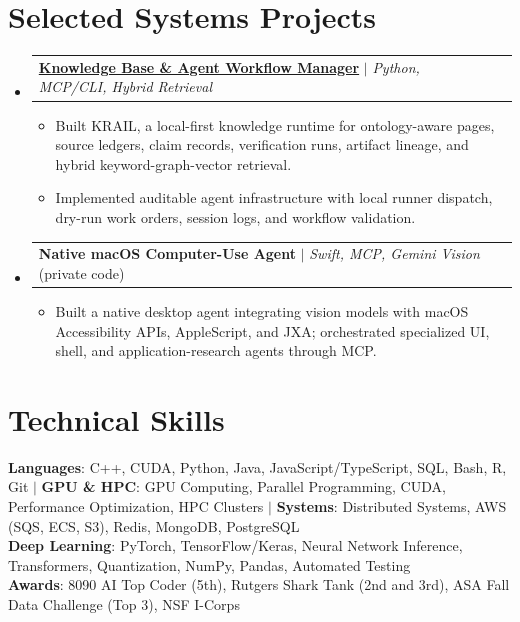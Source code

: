 \documentclass[letterpaper,11pt]{article}
\makeatletter
\newcommand{\resumeItem}[1]{
  \item\small{
    {#1 \vspace{-2pt}}
  }
}
\newcommand{\resumeProjectHeading}[2]{
    \item
    \begin{tabular*}{0.97\textwidth}{l@{\extracolsep{\fill}}r}
      \small#1 & #2 \\
    \end{tabular*}\vspace{-7pt}
}
\newcommand{\resumeSubHeadingListStart}{\begin{itemize}[leftmargin=0.15in, label={}]}
\newcommand{\resumeSubHeadingListEnd}{\end{itemize}}
\newcommand{\resumeItemListStart}{\begin{itemize}}
\newcommand{\resumeItemListEnd}{\end{itemize}\vspace{-5pt}}
\makeatother
\begin{document}
\section{Selected Systems Projects}
  \resumeSubHeadingListStart
    \resumeProjectHeading
      {\href{https://github.com/AkeBoss-tech/knowledge}{\textbf{Knowledge Base \& Agent Workflow Manager}} $|$ \emph{Python, MCP/CLI, Hybrid Retrieval}}{}
      \resumeItemListStart
        \resumeItem{Built KRAIL, a local-first knowledge runtime for ontology-aware pages, source ledgers, claim records, verification runs, artifact lineage, and hybrid keyword-graph-vector retrieval.}
        \resumeItem{Implemented auditable agent infrastructure with local runner dispatch, dry-run work orders, session logs, and workflow validation.}
      \resumeItemListEnd
    \resumeProjectHeading
      {\textbf{Native macOS Computer-Use Agent} $|$ \emph{Swift, MCP, Gemini Vision} (private code)}{}
      \resumeItemListStart
        \resumeItem{Built a native desktop agent integrating vision models with macOS Accessibility APIs, AppleScript, and JXA; orchestrated specialized UI, shell, and application-research agents through MCP.}
      \resumeItemListEnd
  \resumeSubHeadingListEnd
\section{Technical Skills}
 \begin{itemize}[leftmargin=0.15in, label={}]
    \small{\item{
     \textbf{Languages}{: C++, CUDA, Python, Java, JavaScript/TypeScript, SQL, Bash, R, Git} $|$
     \textbf{GPU \& HPC}{: GPU Computing, Parallel Programming, CUDA, Performance Optimization, HPC Clusters} $|$
     \textbf{Systems}{: Distributed Systems, AWS (SQS, ECS, S3), Redis, MongoDB, PostgreSQL} \\
     \textbf{Deep Learning}{: PyTorch, TensorFlow/Keras, Neural Network Inference, Transformers, Quantization, NumPy, Pandas, Automated Testing} \\
     \textbf{Awards}{: 8090 AI Top Coder (5th), Rutgers Shark Tank (2nd and 3rd), ASA Fall Data Challenge (Top 3), NSF I-Corps}
    }}
 \end{itemize}
\end{document}
